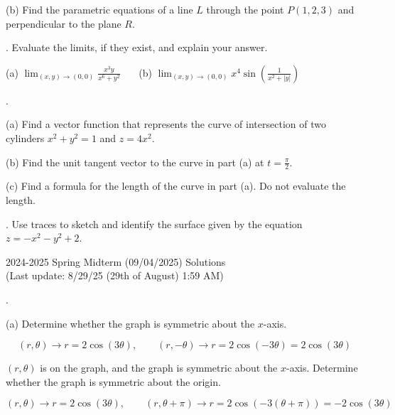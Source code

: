 \documentclass{article}
\begin{document}
\noindent (b) Find the parametric equations of a line $L$ through the point $P(1,2,3)$ and perpendicular to the plane $R$.

\hfill

. Evaluate the limits, if they exist, and explain your answer.

\hfill

\noindent (a) $\displaystyle\lim_{(x,y)\to(0,0)}\frac{x^3y}{x^6+y^2}$ \ \ \ (b) $\displaystyle\lim_{(x,y)\to(0,0)}x^4\sin\left(\frac1{x^2+\left|y\right|}\right)$ \ \ \ 

\hfill

.

\hfill

\noindent (a) Find a vector function that represents the curve of intersection of two cylinders $x^2+y^2=1$ and $z=4x^2$.

\hfill

\noindent (b) Find the unit tangent vector to the curve in part (a) at $\displaystyle t=\frac\pi2$.

\hfill

\noindent (c) Find a formula for the length of the curve in part (a). Do not evaluate the length.

\hfill

. Use traces to sketch and identify the surface given by the equation $z=-x^2-y^2+2$.

\newpage

\begin{center}
2024-2025 Spring Midterm (09/04/2025) Solutions\\
(Last update: 8/29/25 (29th of August) 1:59 AM)
\end{center}

.

\hfill

\noindent (a) Determine whether the graph is symmetric about the $x$-axis.

\[(r,\theta)\rightarrow r=2\cos(3\theta),\qquad (r,-\theta)\rightarrow r=2\cos(-3\theta)=2\cos(3\theta)\]

\hfill

\noindent $(r,\theta)$ is on the graph, and the graph is symmetric about the $x$-axis. Determine whether the graph is symmetric about the origin.

\[(r,\theta)\rightarrow r=2\cos(3\theta),\qquad (r,\theta+\pi)\rightarrow r=2\cos(-3(\theta+\pi))=-2\cos(3\theta)\]

\hfill
\end{document}
